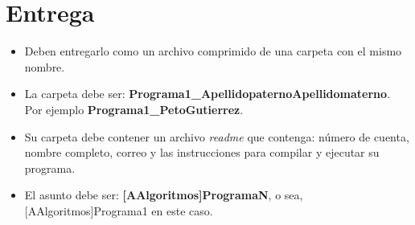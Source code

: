 \documentclass{article}
\begin{document}
\section{Entrega}
\begin{itemize}
\item Deben entregarlo como un archivo comprimido de una carpeta con el mismo nombre.
\item La carpeta debe ser: \textbf{Programa1\_ApellidopaternoApellidomaterno}. Por ejemplo \textbf{Programa1\_PetoGutierrez}.
\item Su carpeta debe contener un archivo \textit{readme} que contenga: número de cuenta, nombre completo, correo y las instrucciones para compilar y ejecutar su programa.
\item El asunto debe ser: \textbf{[AAlgoritmos]ProgramaN}, o sea, [AAlgoritmos]Programa1 en este caso.
\end{itemize}
\end{document}

